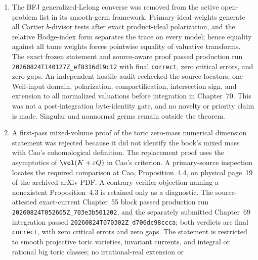\begin{enumerate}
  integral semipositive PL functions, all but at most one harmonic, for
  \(\Lambda=\mathbf Z\) or a divisible additive subgroup of \(\mathbf R\).
  Boundary points are allowed, and no algebraic-closedness or value-group
  compatibility is assumed.  The proof uses the common residue model and an
  integral splitting of the single degree functional.  The exact current
  theorem and proof passed production run
  \texttt{20260824T135721Z\_81346238f7dd} with final \texttt{correct}, zero
  critical errors, and zero gaps.  Arbitrary residual dimension remains open,
  and no novelty or priority claim is made.
\item The BFJ generalized-Lelong converse was removed from the active open-
  problem list in its smooth-germ framework.  Primary-ideal weights generate
  all Cartier \(b\)-divisor tests after exact product-ideal polarization, and
  the relative Hodge-index form separates the trace on every model; hence
  equality against all tame weights forces pointwise equality of valuative
  transforms.  The exact frozen statement and source-aware proof passed
  production run \texttt{20260824T140127Z\_ef8316d19c12} with final
  \texttt{correct}, zero critical errors, and zero gaps.  An independent
  hostile audit rechecked the source locators, one-Weil-input domain,
  polarization, compactification, intersection sign, and extension to all
  normalized valuations before integration in Chapter~70.  This was not a
  post-integration byte-identity gate, and no novelty or priority claim is
  made.  Singular and nonnormal germs remain outside the theorem.
\item A first-pass mixed-volume proof of the toric zero-mass numerical
  dimension statement was rejected because it did not identify the book's
  mixed mass with Cao's cohomological definition.  The replacement proof uses
  the asymptotics of \(\vol(K+\varepsilon Q)\) in Cao's criterion.  A
  primary-source inspection locates the required comparison at Cao,
  Proposition~4.4, on physical page~19 of the archived arXiv PDF.  A contrary
  verifier objection naming a nonexistent Proposition~4.3 is retained only as
  a diagnostic.  The source-attested exact-current Chapter~55 block passed
  production run \texttt{20260824T052605Z\_703e3b501202}, and the separately
  submitted Chapter~69 integration passed
  \texttt{20260824T070302Z\_d706dc98ccca}; both verdicts are final
  \texttt{correct}, with zero critical errors and zero gaps.  The statement is
  restricted to smooth projective toric varieties, invariant currents, and
  integral or rational big toric classes; no irrational-real extension or

\end{enumerate}
